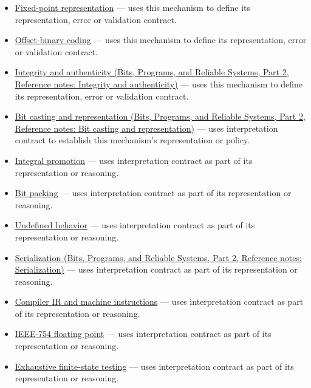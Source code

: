 \hypertarget{appendix-f414bd4ed05c-used-by}{}

\begin{itemize}
\tightlist
\item
  \hyperref[appendix-1d0dbe8924cc]{Fixed-point representation} --- uses this mechanism to define its representation, error or validation contract.
\item
  \hyperref[appendix-53a8cfb25f8d]{Offset-binary coding} --- uses this mechanism to define its representation, error or validation contract.
\item
  \href{../01-Bits-Programs-and-Reliable-Systems-P02/main.pdf\#appendix-cbe594d1ab0a}{Integrity and authenticity (Bits, Programs, and Reliable Systems, Part 2, Reference notes: Integrity and authenticity)} --- uses this mechanism to define its representation, error or validation contract.
\item
  \href{../01-Bits-Programs-and-Reliable-Systems-P02/main.pdf\#appendix-34ee45f161c1}{Bit casting and representation (Bits, Programs, and Reliable Systems, Part 2, Reference notes: Bit casting and representation)} --- uses interpretation contract to establish this mechanism's representation or policy.
\item
  \hyperref[appendix-45303d03796a]{Integral promotion} --- uses interpretation contract as part of its representation or reasoning.
\item
  \hyperref[appendix-1f9963e1a5d1]{Bit packing} --- uses interpretation contract as part of its representation or reasoning.
\item
  \hyperref[appendix-f558f5b4d8f2]{Undefined behavior} --- uses interpretation contract as part of its representation or reasoning.
\item
  \href{../01-Bits-Programs-and-Reliable-Systems-P02/main.pdf\#appendix-91d09ebed979}{Serialization (Bits, Programs, and Reliable Systems, Part 2, Reference notes: Serialization)} --- uses interpretation contract as part of its representation or reasoning.
\item
  \hyperref[appendix-942ad41afb30]{Compiler IR and machine instructions} --- uses interpretation contract as part of its representation or reasoning.
\item
  \hyperref[appendix-343615f49ddf]{IEEE-754 floating point} --- uses interpretation contract as part of its representation or reasoning.
\item
  \hyperref[appendix-05db24ccc28a]{Exhaustive finite-state testing} --- uses interpretation contract as part of its representation or reasoning.

\end{itemize}
